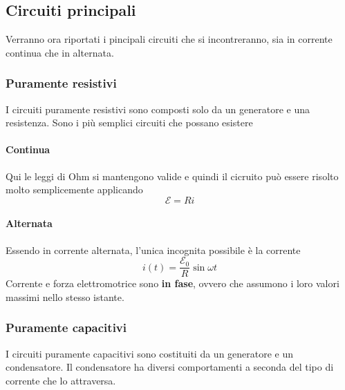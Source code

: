 \subsection{Circuiti principali}
Verranno ora riportati i pincipali circuiti che si incontreranno, sia in corrente continua che in
alternata.

\subsubsection{Puramente resistivi}
I circuiti puramente resistivi sono composti solo da un generatore e una resistenza. Sono i più
semplici circuiti che possano esistere

\paragraph{Continua}
\begin{center}
\end{center}
Qui le leggi di Ohm si mantengono valide e quindi il cicruito può essere risolto molto 
semplicemente applicando
\begin{equation*}
  \mathcal{E} = Ri
\end{equation*}

\paragraph{Alternata}
\begin{center}
\end{center}
Essendo in corrente alternata, l'unica incognita possibile è la corrente
\begin{equation*}
  i(t) = \frac{\mathcal{E}_0}{R}\sin\omega t
\end{equation*}
Corrente e forza elettromotrice sono \textbf{in fase}, ovvero che assumono i loro valori massimi
nello stesso istante.

\subsubsection{Puramente capacitivi}
I circuiti puramente capacitivi sono costituiti da un generatore e un condensatore. Il condensatore
ha diversi comportamenti a seconda del tipo di corrente che lo attraversa.

